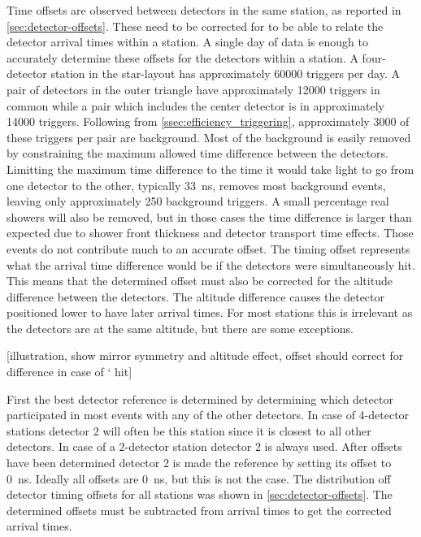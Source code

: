 Time offsets are observed between detectors in the same station, as reported in \cref{sec:detector-offsets}. These need to be corrected for to be able to relate the detector arrival times within a station. A single day of data is enough to accurately determine these offsets for the detectors within a station. A four-detector station in the star-layout has approximately \num{60000} triggers per day. A pair of detectors in the outer triangle have approximately \num{12000} triggers in common while a pair which includes the center detector is in approximately \num{14000} triggers. Following from \cref{ssec:efficiency_triggering}, approximately \num{3000} of these triggers per pair are background. Most of the background is easily removed by constraining the maximum allowed time difference between the detectors. Limitting the maximum time difference to the time it would take light to go from one detector to the other, typically \SI{33}{\ns}, removes most background events, leaving only approximately \num{250} background triggers. A small percentage real showers will also be removed, but in those cases the time difference is larger than expected due to shower front thickness and detector transport time effects. Those events do not contribute much to an accurate offset. The timing offset represents what the arrival time difference would be if the detectors were simultaneously hit. This means that the determined offset must also be corrected for the altitude difference between the detectors. The altitude difference causes the detector positioned lower to have later arrival times. For most stations this is irrelevant as the detectors are at the same altitude, but there are some exceptions.

[illustration, show mirror symmetry and altitude effect, offset should correct for difference in case of ` hit]

First the best detector reference is determined by determining which detector participated in most events with any of the other detectors. In case of 4-detector stations detector 2 will often be this station since it is closest to all other detectors. In case of a 2-detector station detector 2 is always used. After offsets have been determined detector 2 is made the reference by setting its offset to \SI{0}{\ns}. Ideally all offsets are \SI{0}{\ns}, but this is not the case. The distribution off detector timing offsets for all \hisparc stations was shown in \cref{sec:detector-offsets}. The determined offsets must be subtracted from arrival times to get the corrected arrival times.


